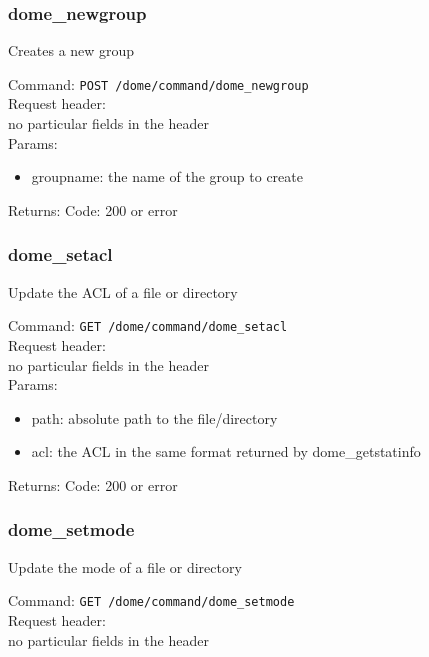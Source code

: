 \documentclass[a4paper,10pt]{scrreprt}
\begin{document}
\subsubsection{dome\_newgroup}

Creates a new group

Command:
\lstinline"POST /dome/command/dome_newgroup"\\

Request header:\\
no particular fields in the header\\

Params:
\begin{itemize}
 \item groupname: the name of the group to create
\end{itemize}

Returns:
Code: 200 or error



\subsubsection{dome\_setacl}

Update the ACL of a file or directory

Command:
\lstinline"GET /dome/command/dome_setacl"\\

Request header:\\
no particular fields in the header\\

Params:
\begin{itemize}
  \item path: absolute path to the file/directory
  \item acl: the ACL in the same format returned by dome\_getstatinfo
\end{itemize}

Returns:
Code: 200 or error



\subsubsection{dome\_setmode}

Update the mode of a file or directory

Command:
\lstinline"GET /dome/command/dome_setmode"\\

Request header:\\
no particular fields in the header\\
\end{document}
